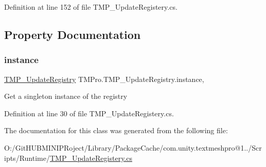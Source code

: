 Definition at line 152 of file T\+M\+P\+\_\+\+Update\+Registery.\+cs.



\subsection{Property Documentation}
\mbox{\label{class_t_m_pro_1_1_t_m_p___update_registry_a4b7cc4e0c23baf71b6925bad7d8aca97}} 
\subsubsection{\texorpdfstring{instance}{instance}}
{\footnotesize\ttfamily \mbox{\hyperlink{class_t_m_pro_1_1_t_m_p___update_registry}{T\+M\+P\+\_\+\+Update\+Registry}} T\+M\+Pro.\+T\+M\+P\+\_\+\+Update\+Registry.\+instance\hspace{0.3cm}{\ttfamily [static]}, {\ttfamily [get]}}



Get a singleton instance of the registry 



Definition at line 30 of file T\+M\+P\+\_\+\+Update\+Registery.\+cs.



The documentation for this class was generated from the following file\+:\begin{DoxyCompactItemize}
\item 
O\+:/\+Git\+H\+U\+B\+M\+I\+N\+I\+P\+Roject/\+Library/\+Package\+Cache/com.\+unity.\+textmeshpro@1../\+Scripts/\+Runtime/\mbox{\hyperlink{_t_m_p___update_registery_8cs}{T\+M\+P\+\_\+\+Update\+Registery.\+cs}}\end{DoxyCompactItemize}
